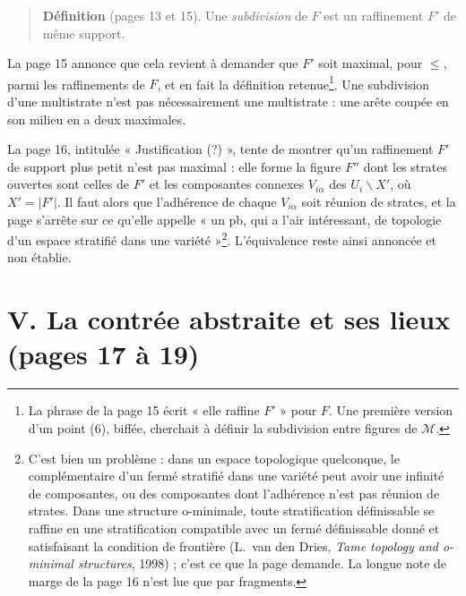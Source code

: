 \documentclass[11pt,a4paper]{article}
\begin{document}
\begin{quote}
\textbf{Définition} (pages 13 et 15). Une \emph{subdivision} de $F$ est un
raffinement $F'$ de même support.
\end{quote}

La page 15 annonce que cela revient à demander que $F'$ soit maximal, pour
$\leq$, parmi les raffinements de $F$, et en fait la définition
retenue\footnote{La phrase de la page 15 écrit « elle raffine $F'$ » pour
$F$. Une première version d'un point (6), biffée, cherchait à définir la
subdivision entre figures de $\mathcal{M}$.}. Une subdivision d'une
multistrate n'est pas nécessairement une multistrate : une arête coupée en son
milieu en a deux maximales.

La page 16, intitulée « Justification (?) », tente de montrer qu'un raffinement
$F'$ de support plus petit n'est pas maximal : elle forme la figure $F''$ dont
les strates ouvertes sont celles de $F'$ et les composantes connexes
$V_{i\alpha}$ des $U_{i} \smallsetminus X'$, où $X' = |F'|$. Il faut alors que
l'adhérence de chaque $V_{i\alpha}$ soit réunion de strates, et la page
s'arrête sur ce qu'elle appelle « un pb, qui a l'air intéressant, de topologie
d'un espace stratifié dans une variété »\footnote{C'est bien un problème : dans
un espace topologique quelconque, le complémentaire d'un fermé stratifié dans
une variété peut avoir une infinité de composantes, ou des composantes dont
l'adhérence n'est pas réunion de strates. Dans une structure o-minimale, toute
stratification définissable se raffine en une stratification compatible avec
un fermé définissable donné et satisfaisant la condition de frontière
(L.~van den Dries, \emph{Tame topology and o-minimal structures}, 1998) ; c'est
ce que la page demande. La longue note de marge de la page 16 n'est lue que par
fragments.}. L'équivalence reste ainsi annoncée et non établie.

\section*{V. La contrée abstraite et ses lieux (pages 17 à 19)}
\end{document}
